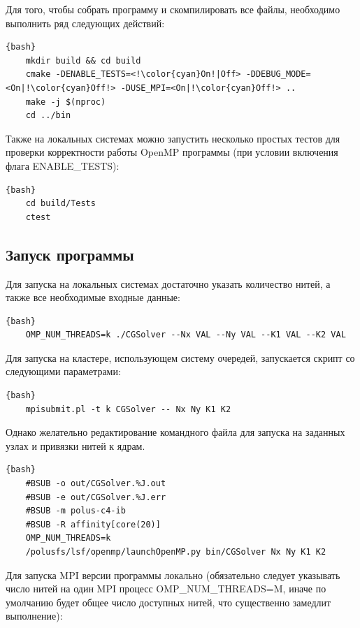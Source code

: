 \documentclass[12pt, a4paper]{article}
\begin{document}
Для того, чтобы собрать программу и скомпилировать все файлы, необходимо выполнить ряд следующих действий:

\begin{lstlisting}[escapechar=!]{bash}
	mkdir build && cd build
	cmake -DENABLE_TESTS=<!\color{cyan}On!|Off> -DDEBUG_MODE=<On|!\color{cyan}Off!> -DUSE_MPI=<On|!\color{cyan}Off!> ..
	make -j $(nproc)
	cd ../bin
\end{lstlisting}

Также на локальных системах можно запустить несколько простых тестов для проверки корректности работы OpenMP программы (при условии включения флага ENABLE\_TESTS):

\begin{lstlisting}{bash}
	cd build/Tests
	ctest
\end{lstlisting}

\subsection{Запуск программы}

Для запуска на локальных системах достаточно указать количество нитей, а также все необходимые входные данные:

\begin{lstlisting}{bash}
	OMP_NUM_THREADS=k ./CGSolver --Nx VAL --Ny VAL --K1 VAL --K2 VAL
\end{lstlisting}

Для запуска на кластере, использующем систему очередей, запускается скрипт со следующими параметрами:

\begin{lstlisting}{bash}
	mpisubmit.pl -t k CGSolver -- Nx Ny K1 K2
\end{lstlisting}

Однако желательно редактирование командного файла для запуска на заданных узлах и привязки нитей к ядрам.

\begin{lstlisting}{bash}
	#BSUB -o out/CGSolver.%J.out
	#BSUB -e out/CGSolver.%J.err
	#BSUB -m polus-c4-ib
	#BSUB -R affinity[core(20)]
	OMP_NUM_THREADS=k
	/polusfs/lsf/openmp/launchOpenMP.py bin/CGSolver Nx Ny K1 K2
\end{lstlisting}

Для запуска MPI версии программы локально (обязательно следует указывать число нитей на один MPI процесс OMP\_NUM\_THREADS=M, иначе по умолчанию будет общее число доступных нитей, что существенно замедлит выполнение):
\end{document}

